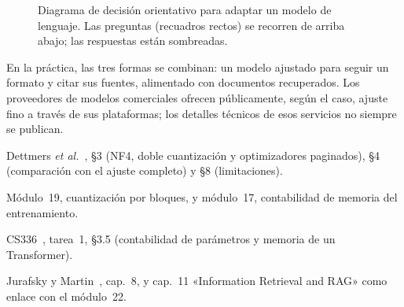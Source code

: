 \begin{figure}[h]
\centering
{}
\caption{Diagrama de decisión orientativo para adaptar un modelo de lenguaje. Las preguntas (recuadros rectos) se recorren de arriba abajo; las respuestas están sombreadas.}
\label{fig:decision}
\end{figure}

En la práctica, las tres formas se combinan: un modelo ajustado para seguir un formato y citar sus fuentes, alimentado con documentos recuperados. Los proveedores de modelos comerciales ofrecen públicamente, según el caso, ajuste fino a través de sus plataformas; los detalles técnicos de esos servicios no siempre se publican.

\begin{lecturas}
\item Dettmers \emph{et al.}~\cite{dettmers}, §3 (NF4, doble cuantización y optimizadores paginados), §4 (comparación con el ajuste completo) y §8 (limitaciones).
\item Módulo~19, cuantización por bloques, y módulo~17, contabilidad de memoria del entrenamiento.
\item CS336~\cite{cs336a1}, tarea~1, §3.5 (contabilidad de parámetros y memoria de un Transformer).
\item Jurafsky y Martin~\cite{jm3}, cap.~8, y cap.~11 «Information Retrieval and RAG» como enlace con el módulo~22.
\end{lecturas}

